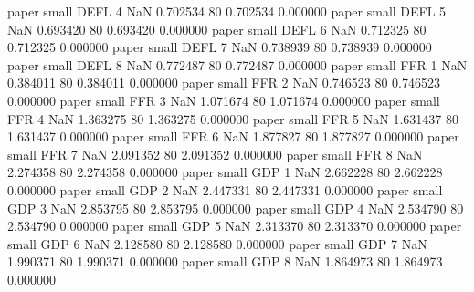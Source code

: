             paper      small     DEFL                 4                  NaN 0.702534 80       0.702534           0.000000
            paper      small     DEFL                 5                  NaN 0.693420 80       0.693420           0.000000
            paper      small     DEFL                 6                  NaN 0.712325 80       0.712325           0.000000
            paper      small     DEFL                 7                  NaN 0.738939 80       0.738939           0.000000
            paper      small     DEFL                 8                  NaN 0.772487 80       0.772487           0.000000
            paper      small      FFR                 1                  NaN 0.384011 80       0.384011           0.000000
            paper      small      FFR                 2                  NaN 0.746523 80       0.746523           0.000000
            paper      small      FFR                 3                  NaN 1.071674 80       1.071674           0.000000
            paper      small      FFR                 4                  NaN 1.363275 80       1.363275           0.000000
            paper      small      FFR                 5                  NaN 1.631437 80       1.631437           0.000000
            paper      small      FFR                 6                  NaN 1.877827 80       1.877827           0.000000
            paper      small      FFR                 7                  NaN 2.091352 80       2.091352           0.000000
            paper      small      FFR                 8                  NaN 2.274358 80       2.274358           0.000000
            paper      small      GDP                 1                  NaN 2.662228 80       2.662228           0.000000
            paper      small      GDP                 2                  NaN 2.447331 80       2.447331           0.000000
            paper      small      GDP                 3                  NaN 2.853795 80       2.853795           0.000000
            paper      small      GDP                 4                  NaN 2.534790 80       2.534790           0.000000
            paper      small      GDP                 5                  NaN 2.313370 80       2.313370           0.000000
            paper      small      GDP                 6                  NaN 2.128580 80       2.128580           0.000000
            paper      small      GDP                 7                  NaN 1.990371 80       1.990371           0.000000
            paper      small      GDP                 8                  NaN 1.864973 80       1.864973           0.000000